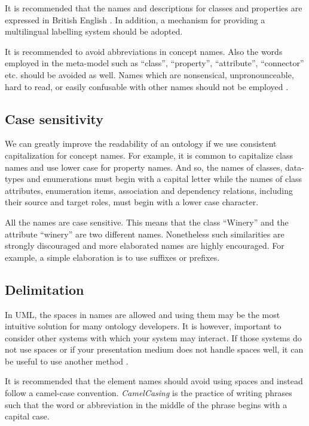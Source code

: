 	It is recommended that the names and descriptions for classes and properties are expressed in British English \cite{d2.01-2017}. In addition, a mechanism for providing a multilingual labelling system should be adopted. 
	
	It is recommended to avoid abbreviations in concept names. Also the words employed in the meta-model such as ``class'', ``property'', ``attribute'', ``connector'' etc. should be avoided as well. Names which are nonsensical, unpronounceable, hard to read, or easily confusable with other names should not be employed \cite{xml1-spec}.

	\subsection{Case sensitivity}	
	\label{sec:casing}
	
	We can greatly improve the readability of an ontology if we use consistent capitalization for concept names. For example, it is common to capitalize class names and use lower case for property names. And so, the names of classes, data-types and enumerations must begin with a capital letter while the names of class attributes, enumeration items, association and dependency relations, including their source and target roles, must begin with a lower case character.
	
	All the names are case sensitive. This means that the class ``Winery'' and the attribute ``winery'' are two different names. Nonetheless such similarities are strongly discouraged and more elaborated names are highly encouraged. For example, a simple elaboration is to use suffixes or prefixes. 

	\subsection{Delimitation}
	\label{sec:delimitation}
	
	In UML, the spaces in names are allowed and using them may be the most intuitive solution for many ontology developers. It is however, important to consider other systems with which your system may interact. If those systems do not use spaces or if your presentation medium does not handle spaces well, it can be useful to use another method \cite{noy2001}. 
	
	It is recommended that the element names should avoid using spaces and instead follow a camel-case convention. \textit{CamelCasing} is the practice of writing phrases such that the word or abbreviation in the middle of the phrase begins with a capital case. 
	
